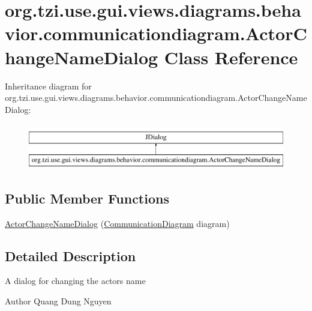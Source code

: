 \hypertarget{classorg_1_1tzi_1_1use_1_1gui_1_1views_1_1diagrams_1_1behavior_1_1communicationdiagram_1_1_actor_change_name_dialog}{\section{org.\-tzi.\-use.\-gui.\-views.\-diagrams.\-behavior.\-communicationdiagram.\-Actor\-Change\-Name\-Dialog Class Reference}
\label{classorg_1_1tzi_1_1use_1_1gui_1_1views_1_1diagrams_1_1behavior_1_1communicationdiagram_1_1_actor_change_name_dialog}
}
Inheritance diagram for org.\-tzi.\-use.\-gui.\-views.\-diagrams.\-behavior.\-communicationdiagram.\-Actor\-Change\-Name\-Dialog\-:\begin{figure}[H]
\begin{center}
\leavevmode
\includegraphics[height=2.000000cm]{classorg_1_1tzi_1_1use_1_1gui_1_1views_1_1diagrams_1_1behavior_1_1communicationdiagram_1_1_actor_change_name_dialog}
\end{center}
\end{figure}
\subsection*{Public Member Functions}
\begin{DoxyCompactItemize}
\item 
\hyperlink{classorg_1_1tzi_1_1use_1_1gui_1_1views_1_1diagrams_1_1behavior_1_1communicationdiagram_1_1_actor_change_name_dialog_a5dc6aea264367edd387d339db66afda1}{Actor\-Change\-Name\-Dialog} (\hyperlink{classorg_1_1tzi_1_1use_1_1gui_1_1views_1_1diagrams_1_1behavior_1_1communicationdiagram_1_1_communication_diagram}{Communication\-Diagram} diagram)
\end{DoxyCompactItemize}


\subsection{Detailed Description}
A dialog for changing the actors name

\begin{DoxyAuthor}{Author}
Quang Dung Nguyen 
\end{DoxyAuthor}


